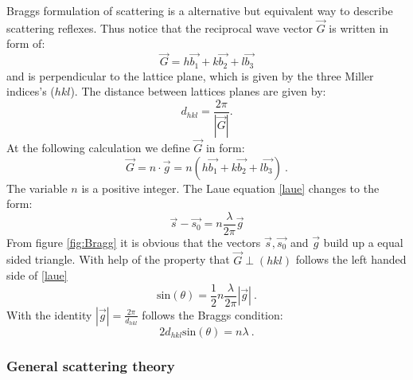 	Braggs formulation of scattering is a alternative but equivalent way to describe scattering reflexes. Thus notice that the reciprocal wave vector $\vec G$ is written in form of:
	\begin{equation}
		\vec G= h\vec{b_1}+k\vec{b_2}+l\vec{b_3}
	\end{equation}
	and is perpendicular to the lattice plane, which is given by the three Miller indices's ($hkl$). The distance between lattices planes are given by:
	\begin{equation}
		d_{hkl}=\frac{2\pi}{|\vec{G}|}.
	\end{equation}
	At the following calculation we define $\vec G$ in form:
	\begin{equation}
		\vec G = n \cdot \vec g = n(h\vec{b_1}+k\vec{b_2}+l\vec{b_3})~\mathrm{.}
	\end{equation}
	The variable $n$ is a positive integer. The Laue equation \ref{laue} changes to the form:
	\begin{equation}
		\vec{s}-\vec{s_0}=n \frac{\lambda}{2 \pi}\vec g
	\end{equation}
	From figure \ref{fig:Bragg} it is obvious that the vectors $\vec s,\vec{s_0}$ and $\vec g$ build up a equal sided triangle. With help of the property that $\vec{G} \perp (hkl)$ follows the left handed side of \ref{laue}
	\begin{equation}
		\mathrm{sin}(\theta)=\frac{1}{2} n \frac{\lambda}{2\pi}|\vec g|~\mathrm{.}
	\end{equation}
	With the identity $|\vec g|= \frac{2\pi}{d_{hkl}}$ follows the Braggs condition:
	\begin{equation}
		2d_{hkl} \mathrm{sin}(\theta)=n \lambda~\mathrm{.}
	\end{equation}
	
	\subsubsection{General scattering theory}
	
